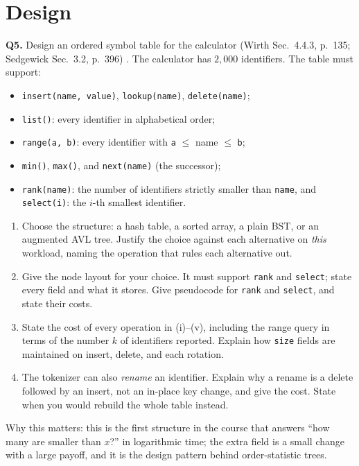 \documentclass[11pt]{article}
\begin{document}
\section{Design}

\textbf{Q5.} Design an ordered symbol table for the calculator (Wirth Sec.~4.4.3, p.~135; Sedgewick Sec.~3.2, p.~396) \cite{Wirth2004_algorithms_data_structures,Sedgewick2011_algorithms}. The calculator has $2{,}000$ identifiers. The table must support:
\begin{itemize}
  \item[(i)] \texttt{insert(name, value)}, \texttt{lookup(name)}, \texttt{delete(name)};
  \item[(ii)] \texttt{list()}: every identifier in alphabetical order;
  \item[(iii)] \texttt{range(a, b)}: every identifier with \texttt{a} $\le$ name $\le$ \texttt{b};
  \item[(iv)] \texttt{min()}, \texttt{max()}, and \texttt{next(name)} (the successor);
  \item[(v)] \texttt{rank(name)}: the number of identifiers strictly smaller than \texttt{name}, and \texttt{select(i)}: the $i$-th smallest identifier.
\end{itemize}
\begin{enumerate}
  \item[(a)] Choose the structure: a hash table, a sorted array, a plain BST, or an augmented AVL tree. Justify the choice against each alternative on \emph{this} workload, naming the operation that rules each alternative out.
  \item[(b)] Give the node layout for your choice. It must support \texttt{rank} and \texttt{select}; state every field and what it stores. Give pseudocode for \texttt{rank} and \texttt{select}, and state their costs.
  \item[(c)] State the cost of every operation in (i)--(v), including the range query in terms of the number $k$ of identifiers reported. Explain how \texttt{size} fields are maintained on insert, delete, and each rotation.
  \item[(d)] The tokenizer can also \emph{rename} an identifier. Explain why a rename is a delete followed by an insert, not an in-place key change, and give the cost. State when you would rebuild the whole table instead.
\end{enumerate}
Why this matters: this is the first structure in the course that answers ``how many are smaller than $x$?'' in logarithmic time; the extra field is a small change with a large payoff, and it is the design pattern behind order-statistic trees.
\end{document}
